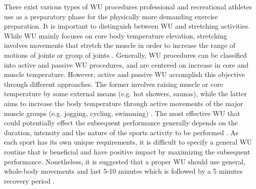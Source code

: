 There exist various types of WU procedures professional and recreational athletes use as a preparatory phase for the physically more demanding exercise preparation. It is important to distinguish between WU and stretching activities. While WU mainly focuses on core body temperature elevation, stretching involves movements that stretch the muscle in order to increase the range of motions of joints or group of joints \cite{knudson2008warm}. 
Generally, WU procedures can be classified into active and passive WU procedures, and are centered on increase in core and muscle temperature. However, active and passive WU accomplish this objective through different approaches. The former involves raising muscle or core temperature by some external means (e.g. hot showers, saunas), while the latter aims to increase the body temperature through active movements of the major muscle groups (e.g. jogging, cycling, swimming) \cite{shellock1985warming, bishop2003warm2}. The most effective WU that could potentially effect the subsequent performance generally depends on the duration, intensity and the nature of the sports activity to be performed \cite{bishop2003warm2}. As each sport has its own unique requirements, it is difficult to specify a general WU routine that is beneficial and have positive impact by maximizing the subsequent performance. Nonetheless, it is suggested that a proper WU should use general, whole-body movements and last 5-10 minutes which is followed by a 5 minutes recovery period \cite{bishop2003warm2}.  
